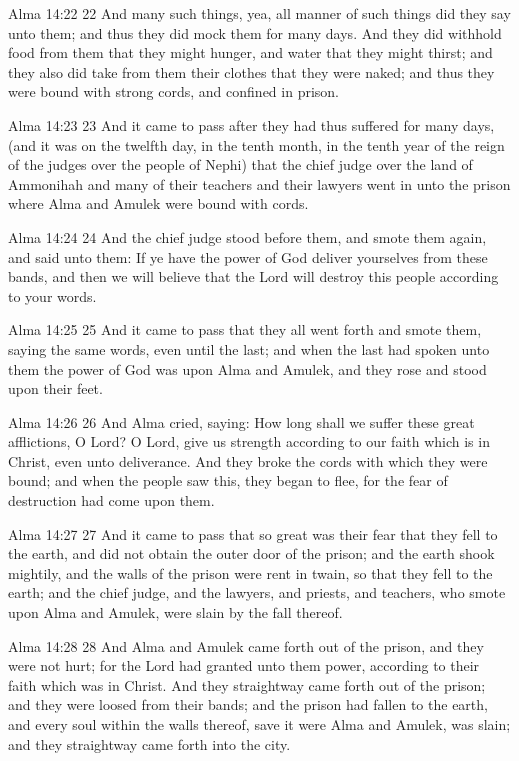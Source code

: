 Alma 14:22
 22 And many such things, yea, all manner of such things did they
say unto them; and thus they did mock them for many days. And
they did withhold food from them that they might hunger, and
water that they might thirst; and they also did take from them
their clothes that they were naked; and thus they were bound with
strong cords, and confined in prison.

Alma 14:23
 23 And it came to pass after they had thus suffered for many
days, (and it was on the twelfth day, in the tenth month, in the
tenth year of the reign of the judges over the people of Nephi)
that the chief judge over the land of Ammonihah and many of their
teachers and their lawyers went in unto the prison where Alma and
Amulek were bound with cords.

Alma 14:24
 24 And the chief judge stood before them, and smote them again,
and said unto them: If ye have the power of God deliver
yourselves from these bands, and then we will believe that the
Lord will destroy this people according to your words.

Alma 14:25
 25 And it came to pass that they all went forth and smote them,
saying the same words, even until the last; and when the last had
spoken unto them the power of God was upon Alma and Amulek, and
they rose and stood upon their feet.

Alma 14:26
 26 And Alma cried, saying: How long shall we suffer these great
afflictions, O Lord? O Lord, give us strength according to our
faith which is in Christ, even unto deliverance. And they broke
the cords with which they were bound; and when the people saw
this, they began to flee, for the fear of destruction had come
upon them.

Alma 14:27
 27 And it came to pass that so great was their fear that they
fell to the earth, and did not obtain the outer door of the
prison; and the earth shook mightily, and the walls of the prison
were rent in twain, so that they fell to the earth; and the chief
judge, and the lawyers, and priests, and teachers, who smote upon
Alma and Amulek, were slain by the fall thereof.

Alma 14:28
 28 And Alma and Amulek came forth out of the prison, and they
were not hurt; for the Lord had granted unto them power,
according to their faith which was in Christ. And they
straightway came forth out of the prison; and they were loosed
from their bands; and the prison had fallen to the earth, and
every soul within the walls thereof, save it were Alma and
Amulek, was slain; and they straightway came forth into the city.

